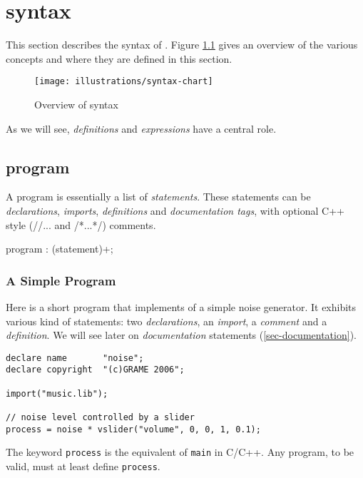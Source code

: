 \chapter{\faust syntax}
\label{syntax}


This section describes the syntax of \faust. Figure \ref{fig-syntax} gives an overview of the various concepts and where they are defined in this section. 
\begin{figure}[ht!]
\centering
\texttt{[image: illustrations/syntax-chart]}
\caption{Overview of \faust syntax}
\label{fig-syntax}
\end{figure}

As we will see, \textit{definitions} and \textit{expressions} have a central role.

\section{\faust program}

A \faust program is essentially a list of \textit{statements}. These statements can be \textit{declarations}, \textit{imports}, \textit{definitions} and \textit{documentation tags}, with optional C++ style (//... and /*...*/) comments.
 
\begin{rail}
program : (statement)+;
\end{rail}

\subsection{A Simple Program}

Here is a short \faust program that implements of a simple noise generator. It exhibits various kind of statements: two \textit{declarations}, an \textit{import}, a \textit{comment} and a \textit{definition}. We will see later on \textit{documentation} statements (\ref{sec-documentation}).

\begin{lstlisting}
declare name       "noise";
declare copyright  "(c)GRAME 2006";

import("music.lib");

// noise level controlled by a slider
process = noise * vslider("volume", 0, 0, 1, 0.1);
\end{lstlisting}
 
The keyword \lstinline'process' is the equivalent of \lstinline'main' in C/C++. Any \faust program, to be valid, must at least define \lstinline'process'.

